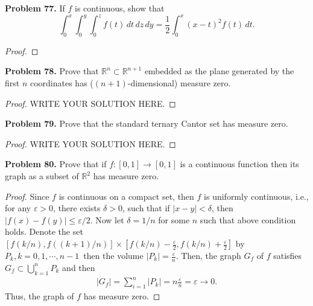 \documentclass[11pt]{article}
\theoremstyle{definition}
\theoremstyle{definition}
\begin{document}
\medskip


\noindent
{\bf Problem 77.}
If $f$ is continuous, show that
$$
\int_0^x\int_0^y\int_0^z f(t)\, dt\, dz\, dy =
\frac{1}{2}\int_0^x (x-t)^2f(t)\, dt.
$$

\begin{proof}

\end{proof}


\medskip

\noindent
{\bf Problem 78.}
 Prove that $\mathbb{R}^n\subset\mathbb{R}^{n+1}$ embedded as the plane generated by the
first $n$ coordinates has ($(n+1)$-dimensional) measure zero.
\begin{proof}
	WRITE YOUR SOLUTION HERE.
\end{proof}


\medskip

\noindent
{\bf Problem 79.}
Prove that the standard ternary Cantor set has measure zero.
\begin{proof}
	WRITE YOUR SOLUTION HERE.
\end{proof}


\medskip

\noindent
{\bf Problem 80.}
Prove that if $f:[0,1]\to [0,1]$ is a continuous function then its graph as
a subset of $\mathbb{R}^2$ has measure zero.
\begin{proof}
Since $f$ is continuous on a compact set, then $f$ is uniformly continuous, i.e., for any $\varepsilon > 0$, there exists $\delta > 0$, such that if $|x - y| < \delta$, then $|f(x) - f(y)| \leq \varepsilon/2$. Now let $\delta = 1/n$ for some $n$ such that above condition holds. Denote the set $\left[f\left(k/n\right), f\left((k+1)/n\right)\right] \times \left[f\left(k/n\right) - \frac{\varepsilon}{2}, f\left(k/n\right) + \frac{\varepsilon}{2}\right]$ by $P_k, k = 0,1,\cdots,n-1$\, then the volume $|P_k| = \frac{\varepsilon}{n}$. Then, the graph $G_f$ of $f$ satisfies $G_f \subset \bigcup^n_{k=1} P_k$ and then 
\begin{align*}
    |G_f| = \sum^n_{i=1} |P_k| = n \frac{\varepsilon}{n} = \varepsilon \to 0.
\end{align*}
Thus, the graph of $f$ has measure zero.
\end{proof}


\medskip
\end{document}
